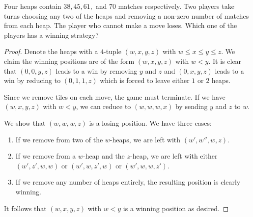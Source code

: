 \documentclass[11pt]{article}
\renewcommand{\>}{\rangle}
\newcommand{\<}{\langle}
\begin{document}
\begin{problem} Four heaps contain $38, 45, 61,$ and $70$ matches respectively.  Two players take turns choosing any two of the heaps and removing a non-zero number of matches from each heap.  The player who cannot make a move loses. Which one of the players has a winning strategy?
\end{problem}

\begin{proof}
Denote the heaps with a $4$-tuple $(w, x, y, z)$ with $w \le x \le y \le z$.  We claim the winning positions are of the form $(w, x, y, z)$ with $w < y$.  It is clear that $(0, 0, y, z)$ leads to a win by removing $y$ and $z$ and $(0, x, y, z)$ leads to a win by reducing to $(0, 1, 1, z)$ which is forced to leave either $1$ or $2$ heaps.

Since we remove tiles on each move, the game must terminate.  If we have $(w, x, y, z)$ with $w < y$, we can reduce to $(w, w, w, x)$ by sending $y$ and $z$ to $w$.

We show that $(w, w, w, z)$ is a losing position.  We have three cases:
\begin{enumerate}
\item If we remove from two of the $w$-heaps, we are left with $(w', w'', w, z)$.
\item If we remove from a $w$-heap and the $z$-heap, we are left with either $(w', z', w, w)$ or $(w', w, z', w)$ or $(w', w, w, z')$.
\item If we remove any number of heaps entirely, the resulting position is clearly winning.
\end{enumerate}

It follows that $(w, x, y, z)$ with $w < y$ is a winning position as desired. 
\end{proof}
\end{document}
